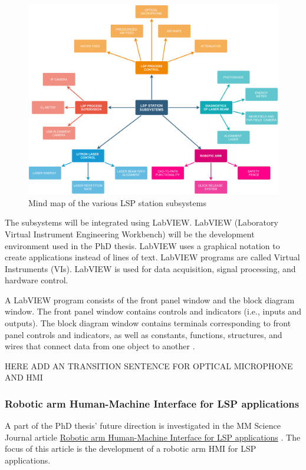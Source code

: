 \begin{figure}[h]
    \centering
    \includegraphics[width=1.0\linewidth]{img/LSP_SUBSYSTEMS.pdf}
    \caption{Mind map of the various LSP station subsystems}
    \label{fig:subsystems}
\end{figure}


The subsystems will be integrated using LabVIEW. LabVIEW (Laboratory Virtual Instrument Engineering Workbench) will be the development environment used in the PhD thesis. LabVIEW uses a graphical notation to create applications instead of lines of text. LabVIEW programs are called Virtual Instruments (VIs). LabVIEW is used for data acquisition, signal processing, and hardware control.

A LabVIEW program consists of the front panel window and the block diagram window. The front panel window contains controls and indicators (i.e., inputs and outputs). The block diagram window contains terminals corresponding to front panel controls and indicators, as well as constants, functions, structures, and wires that connect data from one object to another \cite{bress_2013}.

HERE ADD AN TRANSITION SENTENCE FOR OPTICAL MICROPHONE AND HMI


\subsubsection*{Robotic arm Human-Machine Interface for LSP applications}
\label{sec:mm_science}
A part of the PhD thesis' future direction is investigated in the MM Science Journal article \href{https://www.mmscience.eu/journal/issues/december-2019/articles/robotic-arm-human-machine-interface-for-laser-shock-peening-applications}{Robotic arm Human-Machine Interface for LSP applications} \cite{bohm_kaufman_brajer_rostohar_2019}.   The focus of this article is the development of a robotic arm HMI for LSP applications.

